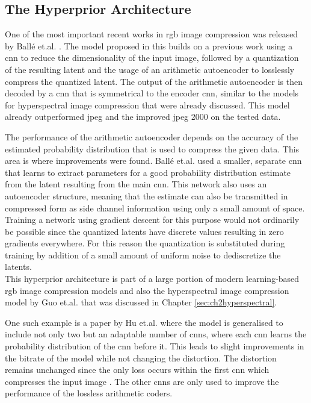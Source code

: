\subsection{The Hyperprior Architecture}
One of the most important recent works in \ac{rgb} image compression was released by Ballé et.al. \citep{balle_variational_2018}. The model proposed in this builds on a previous work \citep{balle_end--end_2017} using a \ac{cnn} to reduce the dimensionality of the input image, followed by a quantization of the resulting latent and the usage of an arithmetic autoencoder to losslessly compress the quantized latent. The output of the arithmetic autoencoder is then decoded by a \ac{cnn} that is symmetrical to the encoder \ac{cnn}, similar to the models for hyperspectral image compression that were already discussed. This model already outperformed \ac{jpeg} and the improved \ac{jpeg} 2000 on the tested data.

The performance of the arithmetic autoencoder depends on the accuracy of the estimated probability distribution that is used to compress the given data. This area is where improvements were found. Ballé et.al. \citep{balle_variational_2018} used a smaller, separate \ac{cnn} that learns to extract parameters for a good probability distribution estimate from the latent resulting from the main \ac{cnn}. This network also uses an autoencoder structure, meaning that the estimate can also be transmitted in compressed form as side channel information using only a small amount of space. Training a network using gradient descent for this purpose would not ordinarily be possible since the quantized latents have discrete values resulting in zero gradients everywhere. For this reason the quantization is substituted during training by addition of a small amount of uniform noise to dediscretize the latents.\\
This hyperprior architecture is part of a large portion of modern learning-based \ac{rgb} image compression models and also the hyperspectral image compression model by Guo et.al. \citep{guo_learned_2021} that was discussed in Chapter \ref{sec:ch2hyperspectral}.

One such example is a paper by Hu et.al. \citep{hu_coarse--fine_2020} where the model is generalised to include not only two but an adaptable number of \acp{cnn}, where each \ac{cnn} learns the probability distribution of the \ac{cnn} before it. This leads to slight improvements in the bitrate of the model while not changing the distortion. The distortion remains unchanged since the only loss occurs within the first \ac{cnn} which compresses the input image . The other \acp{cnn} are only used to improve the performance of the lossless arithmetic coders.


